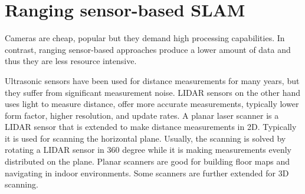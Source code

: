 \documentclass[conference]{IEEEtran}
\begin{document}
%






\section{Ranging sensor-based SLAM}
Cameras are cheap, popular but they demand high processing capabilities. In contrast, ranging sensor-based approaches produce a lower amount of data and thus they are less resource intensive. 

Ultrasonic sensors have been used for distance measurements for many years, but they suffer from significant measurement noise. LIDAR sensors on the other hand uses light to measure distance, offer more accurate measurements, typically lower form factor, higher resolution, and update rates. A planar laser scanner is a LIDAR sensor that is extended to make distance measurements in 2D. Typically it is used for scanning the horizontal plane. Usually, the scanning is solved by rotating a LIDAR sensor in 360 degree while it is making measurements evenly distributed on the plane. Planar scanners are good for building floor maps and navigating in indoor environments. Some scanners are further extended for 3D scanning. 
\end{document}
